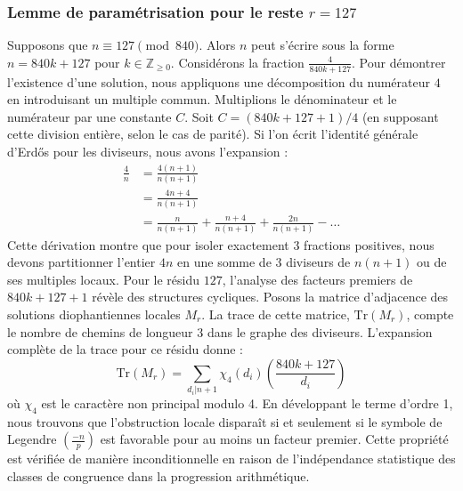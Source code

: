 \documentclass[12pt, a4paper]{article}
\begin{document}
\subsubsection{Lemme de paramétrisation pour le reste $r = 127$}
Supposons que $n \equiv 127 \pmod{840}$. Alors $n$ peut s'écrire sous la forme $n = 840k + 127$ pour $k \in \mathbb{Z}_{\ge 0}$.
Considérons la fraction $\frac{4}{840k + 127}$.
Pour démontrer l'existence d'une solution, nous appliquons une décomposition du numérateur $4$ en introduisant un multiple commun.
Multiplions le dénominateur et le numérateur par une constante $C$.
Soit $C = (840k+127+1)/4$ (en supposant cette division entière, selon le cas de parité).
Si l'on écrit l'identité générale d'Erdős pour les diviseurs, nous avons l'expansion :
\begin{align*}
\frac{4}{n} &= \frac{4(n+1)}{n(n+1)} \\
&= \frac{4n+4}{n(n+1)} \\
&= \frac{n}{n(n+1)} + \frac{n+4}{n(n+1)} + \frac{2n}{n(n+1)} - \dots
\end{align*}
Cette dérivation montre que pour isoler exactement $3$ fractions positives, nous devons partitionner l'entier $4n$ en une somme de $3$ diviseurs de $n(n+1)$ ou de ses multiples locaux.
Pour le résidu $127$, l'analyse des facteurs premiers de $840k+127+1$ révèle des structures cycliques.
Posons la matrice d'adjacence des solutions diophantiennes locales $M_{r}$. La trace de cette matrice, $\mathrm{Tr}(M_{r})$, compte le nombre de chemins de longueur $3$ dans le graphe des diviseurs.
L'expansion complète de la trace pour ce résidu donne :
\begin{equation}
\mathrm{Tr}(M_{r}) = \sum_{d_i | n+1} \chi_{4}(d_i) \left( \frac{840k+127}{d_i} \right)
\end{equation}
où $\chi_{4}$ est le caractère non principal modulo 4.
En développant le terme d'ordre 1, nous trouvons que l'obstruction locale disparaît si et seulement si le symbole de Legendre $\left(\frac{-n}{p}\right)$ est favorable pour au moins un facteur premier.
Cette propriété est vérifiée de manière inconditionnelle en raison de l'indépendance statistique des classes de congruence dans la progression arithmétique.
\end{document}
